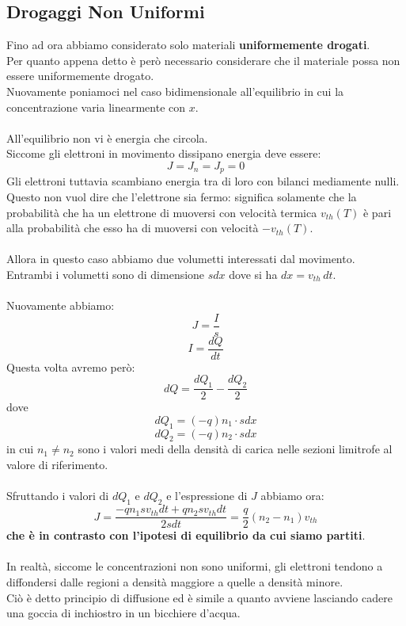 \documentclass[../main.tex]{subfiles}
\begin{document}
	\subsection{Drogaggi Non Uniformi}
	Fino ad ora abbiamo considerato solo materiali \textbf{uniformemente drogati}. \\
	Per quanto appena detto è però necessario considerare che il materiale possa non essere uniformemente drogato. \\
	Nuovamente poniamoci nel caso bidimensionale all’equilibrio in cui la concentrazione varia linearmente con $x$.\\\\
	All’equilibrio non vi è energia che circola. \\
	Siccome gli elettroni in movimento dissipano energia deve essere:
	$$J = J_n = J_p = 0$$
	Gli elettroni tuttavia scambiano energia tra di loro con bilanci mediamente nulli. \\
	Questo non vuol dire che l’elettrone sia fermo: significa solamente che la probabilità che ha un elettrone di muoversi con velocità termica $v_{th}(T)$ è pari alla probabilità che esso ha di muoversi con velocità $-v_{th}(T)$.\\\\
	Allora in questo caso abbiamo due volumetti interessati dal movimento. \\
	Entrambi i volumetti sono di dimensione $sdx$ dove si ha $dx = v_{th} \, dt$.\\\\
	Nuovamente abbiamo:
	$$J = \frac{I}{s}$$
	$$I = \frac{dQ}{dt}$$
	Questa volta avremo però:
	$$dQ = \frac{dQ_1}{2} - \frac{dQ_2}{2}$$
	dove
	$$dQ_1 = (-q) n_1 \cdot s dx$$
	$$dQ_2 = (-q) n_2 \cdot s dx$$
	in cui $n_1 \neq n_2$ sono i valori medi della densità di carica nelle sezioni limitrofe al valore di riferimento.\\\\
	Sfruttando i valori di $dQ_1$ e $dQ_2$ e l’espressione di $J$ abbiamo ora:
	$$J = \frac{-qn_1 sv_{th} dt + qn_2 sv_{th} dt}{2s dt} = \frac{q}{2}(n_2 - n_1)v_{th}$$
	\textbf{che è in contrasto con l’ipotesi di equilibrio da cui siamo partiti}.\\\\
	In realtà, siccome le concentrazioni non sono uniformi, gli elettroni tendono a diffondersi dalle regioni a densità maggiore a quelle a densità minore. \\
	Ciò è detto principio di diffusione ed è simile a quanto avviene lasciando cadere una goccia di inchiostro in un bicchiere d’acqua.\\\\
\end{document}
